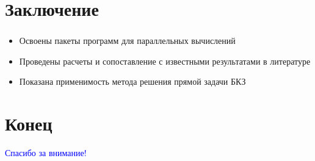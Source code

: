 
\section{Заключение}

\begin{frame}
\frametitle{\insertsection}

\begin{itemize}
    \item Освоены пакеты программ для параллельных вычислений
    \item Проведены расчеты и сопоставление с известными результатами в литературе
    \item Показана применимость метода решения прямой задачи БКЗ
\end{itemize}
\end{frame}


\section{Конец}

\begin{frame}
\centering
\vfill
\textcolor{Blue}{\Large Спасибо за внимание!}
\vfill
\end{frame}